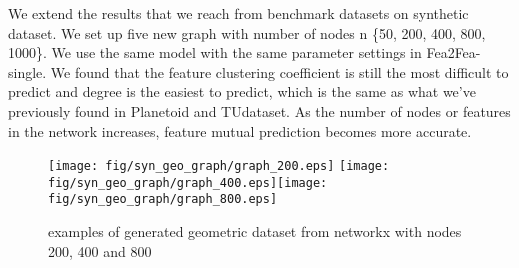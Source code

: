 \documentclass[runningheads]{llncs}
\begin{document}
We extend the results that we reach from benchmark datasets on synthetic dataset. We set up five new graph with number of nodes n  \{50, 200, 400, 800, 1000\}. We use the same model with the same parameter settings in Fea2Fea-single. We found that the feature clustering coefficient is still the most difficult to predict and degree is the easiest to predict, which is the same as what we've previously found in Planetoid and TUdataset. As the number of nodes or features in the network increases, feature mutual prediction becomes more accurate.
  \begin{figure}[!htp]
    \centering
    \begin{center}
    \hspace*{-1in}
        \texttt{[image: fig/syn\_geo\_graph/graph\_200.eps]}
        \texttt{[image: fig/syn\_geo\_graph/graph\_400.eps]}\texttt{[image: fig/syn\_geo\_graph/graph\_800.eps]}
        \hspace*{-1in}
        \caption{examples of generated geometric dataset from networkx with nodes 200, 400 and 800}
      \end{center}
    \end{figure}
\end{document}
